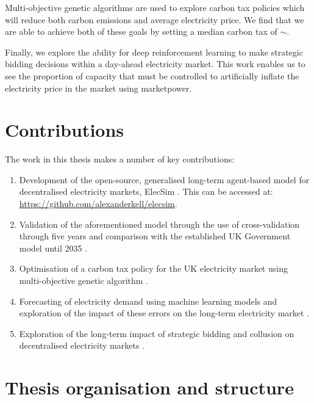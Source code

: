 Multi-objective genetic algorithms are used to explore carbon tax policies which will reduce both carbon emissions and average electricity price. We find that we are able to achieve both of these goals by setting a median carbon tax of ${\sim}$.

Finally, we explore the ability for deep reinforcement learning to make strategic bidding decisions within a day-ahead electricity market. This work enables us to see the proportion of capacity that must be controlled to artificially inflate the electricity price in the market using \gls{marketpower}. 

\section{Contributions}

The work in this thesis makes a number of key contributions:

\begin{enumerate}
	\item Development of the open-source, generalised long-term agent-based model for decentralised electricity markets, ElecSim \cite{Kell}. This can be accessed at: \url{https://github.com/alexanderkell/elecsim}.
	\item Validation of the aforementioned model through the use of cross-validation through five years and comparison with the established UK Government model until 2035 \cite{Kell2020}.
	\item Optimisation of a carbon tax policy for the UK electricity market using multi-objective genetic algorithm \cite{Kell2020a}.
	\item Forecasting of electricity demand using machine learning models and exploration of the impact of these errors on the long-term electricity market \cite{Kell2018a}.
	\item Exploration of the long-term impact of strategic bidding and collusion on decentralised electricity markets \cite{Kell2020d}.
\end{enumerate}

\section{Thesis organisation and structure}


